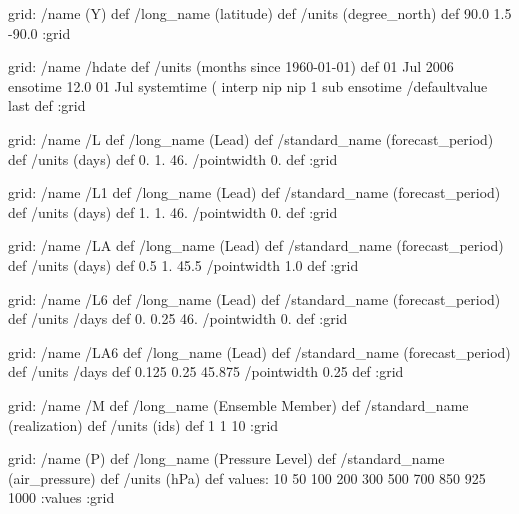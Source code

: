\begin{ingrid}
{grid:
/name (Y) def
/long_name (latitude) def
/units (degree_north) def
90.0 1.5 -90.0
:grid

grid:
/name /hdate def
/units (months since 1960-01-01) def
01 Jul 2006 ensotime
12.0
01 Jul 
systemtime
   (%
    interp nip nip
    1 sub
ensotime
/defaultvalue { last } def
:grid

grid:
/name /L def
/long_name (Lead) def
/standard_name (forecast_period) def
/units (days) def
0. 1. 46.
/pointwidth 0. def
:grid

grid:
/name /L1 def
/long_name (Lead) def
/standard_name (forecast_period) def
/units (days) def
1. 1. 46.
/pointwidth 0. def
:grid

grid:
/name /LA def
/long_name (Lead) def
/standard_name (forecast_period) def
/units (days) def
0.5 1. 45.5
/pointwidth 1.0 def
:grid

 grid:
 /name /L6 def
 /long_name (Lead) def
 /standard_name (forecast_period) def
 /units /days def
 0. 0.25 46.
 /pointwidth 0. def
 :grid
 
 grid:
 /name /LA6 def
 /long_name (Lead) def
 /standard_name (forecast_period) def
 /units /days def
 0.125 0.25 45.875
 /pointwidth 0.25 def
 :grid

grid:
/name /M def
/long_name (Ensemble Member) def
/standard_name (realization) def
/units (ids) def
1 1 10
:grid

grid:
/name (P) def
/long_name (Pressure Level) def
/standard_name (air_pressure) def
/units (hPa) def
values: 10 50 100 200 300 500 700 850 925 1000 :values
:grid

}
\end{ingrid}
